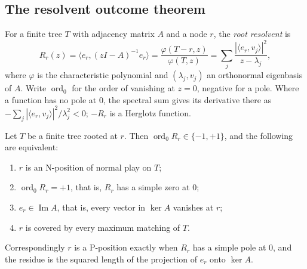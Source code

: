 \documentclass[final]{siamart0516}
\numberwithin{theorem}{section}
\numberwithin{equation}{section}
\theoremstyle{siamnonum}
\theoremstyle{plain}
\newcommand{\ord}{\operatorname{ord}}
\begin{document}
\subsection{The resolvent outcome theorem}
For a finite tree $T$ with adjacency matrix $A$ and a node $r$, the \emph{root resolvent} is
\[
R_r(z)=\bigl\langle e_r,(zI-A)^{-1}e_r\bigr\rangle=\frac{\varphi(T-r,z)}{\varphi(T,z)}=\sum_j\frac{|\langle e_r,v_j\rangle|^2}{z-\lambda_j},
\]
where $\varphi$ is the characteristic polynomial and $(\lambda_j,v_j)$ an orthonormal eigenbasis of $A$. Write $\ord_0$ for the order of vanishing at $z=0$, negative for a pole. Where a function has no pole at $0$, the spectral sum gives its derivative there as $-\sum_j|\langle e_r,v_j\rangle|^2/\lambda_j^2<0$; $-R_r$ is a Herglotz function.

\begin{theorem}\label{thm:resolvent-outcome}
Let $T$ be a finite tree rooted at $r$. Then $\ord_0R_r\in\{-1,+1\}$, and the following are equivalent:
\begin{enumerate}[label=\textup{(\arabic*)}]
\item $r$ is an N-position of normal play on $T$;
\item $\ord_0R_r=+1$, that is, $R_r$ has a simple zero at $0$;
\item $e_r\in\operatorname{Im}A$, that is, every vector in $\ker A$ vanishes at $r$;
\item $r$ is covered by every maximum matching of $T$.
\end{enumerate}
Correspondingly $r$ is a P-position exactly when $R_r$ has a simple pole at $0$, and the residue is the squared length of the projection of $e_r$ onto $\ker A$.
\end{theorem}
\end{document}
